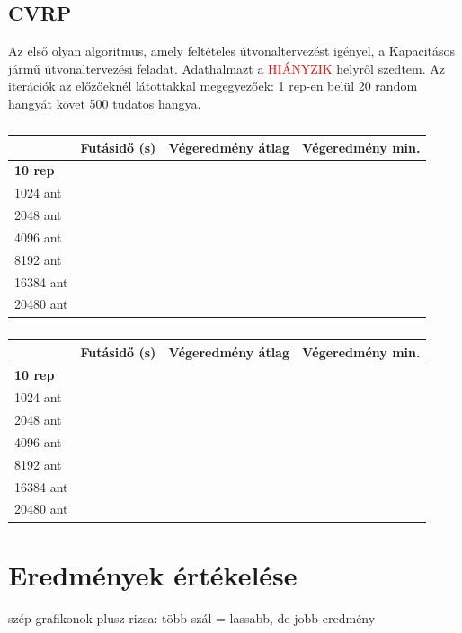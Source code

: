 \subsection{CVRP}
Az első olyan algoritmus, amely feltételes útvonaltervezést igényel, a Kapacitásos jármű útvonaltervezési feladat. Adathalmazt a \textcolor{red}{HIÁNYZIK} helyről szedtem.
Az iterációk az előzőeknél látottakkal megegyezőek: 1 rep-en belül 20 random hangyát követ 500 tudatos hangya.

\begin{table}[ht!]
	\centering
	\begin{tabular}{|p{2cm}||p{3cm}|p{3.5cm}|p{3.5cm}|}
		
		\hline
		& Futásidő (s) & Végeredmény átlag & Végeredmény min.\\
		\hline
		\textbf{10 rep} & \\
		1024 ant & \\
		2048 ant & \\
		4096 ant & \\
		8192 ant & \\
		16384 ant & \\
		20480 ant & \\
		\hline
	\end{tabular}
	\caption{}
	\label{table:TSPv2_empty}
\end{table}

\begin{table}[ht!]
	\centering
	\begin{tabular}{|p{2cm}||p{3cm}|p{3.5cm}|p{3.5cm}|}
		
		\hline
		& Futásidő (s) & Végeredmény átlag & Végeredmény min.\\
		\hline
		\textbf{10 rep} & \\
		1024 ant & \\
		2048 ant & \\
		4096 ant & \\
		8192 ant & \\
		16384 ant & \\
		20480 ant & \\
		\hline
	\end{tabular}
	\caption{}
	\label{table:CVRP_empty}
\end{table}


\section{Eredmények értékelése}

szép grafikonok plusz rizsa: több szál = lassabb, de jobb eredmény